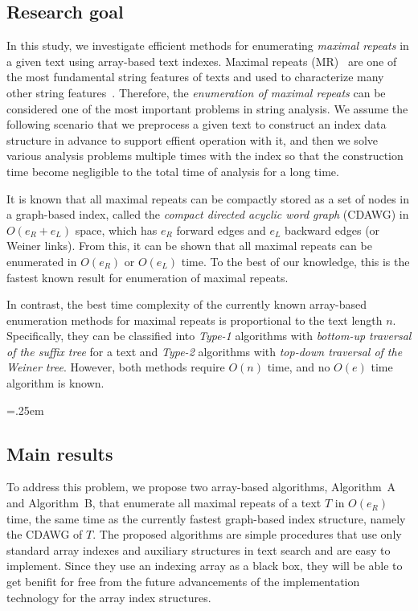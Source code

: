 \subsection{Research goal}
In this study, we investigate efficient methods for enumerating \textit{maximal repeats} in a given text using array-based text indexes. Maximal repeats (MR)~\cite{raffinot2001maximal} are one of the most fundamental string features of texts and used to characterize many other string features~\cite{gusfield1997algorithms,ohlebusch2013bookbioinfo}. Therefore, the \textit{enumeration of maximal repeats} can be considered one of the most important problems in string analysis.
We assume the following scenario that we  preprocess a given text to construct an index data structure in advance to support effient operation with it, and then we solve various analysis problems multiple times with the index so that the construction time become negligible to the total time of analysis for a long time. 

It is known that all maximal repeats can be compactly stored as a set of nodes in a graph-based index, called the \textit{compact directed acyclic word graph} (CDAWG) in $O(e_R+e_L)$ space, which has $e_R$ forward edges and $e_L$ backward edges (or Weiner links). 
From this, it can be shown that all maximal repeats can be enumerated in $O(e_R)$ or $O(e_L)$ time. 
To the best of our knowledge, this is the fastest known result for enumeration of maximal repeats. 

In contrast, the best time complexity of the currently known array-based enumeration methods for maximal repeats is proportional to the text length $n$. Specifically, they can be classified into \textit{Type-1} algorithms with \textit{bottom-up traversal of the suffix tree} for a text and \textit{Type-2} algorithms with \textit{top-down traversal of the Weiner tree}. However, both methods require $O(n)$ time, and no $O(e)$ time algorithm is known.


\begin{table}[t]\centering\tabcolsep=.25em 
\end{table}

\subsection{Main results}
To address this problem, we propose two array-based algorithms, Algorithm~A and Algorithm~B, 
that enumerate all maximal repeats of a text $T$ in $O(e_R)$ time, the same time as the currently fastest graph-based index structure, namely the CDAWG of $T$. 
The proposed algorithms are simple procedures that use only standard array indexes and auxiliary structures in text search and are easy to implement. Since they use an indexing array as a black box, they will be able to get benifit for free from the future advancements of the implementation technology for the array index structures. 

